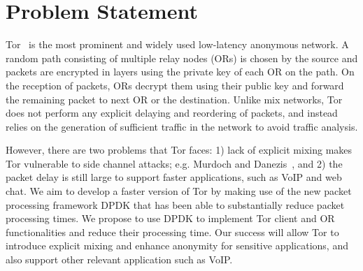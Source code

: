 \section{Problem Statement}
\label{sec:prob-statement}

Tor~\cite{Dingledine:2004:TSO:1251375.1251396} is the most prominent and widely used low-latency anonymous network. A random path consisting of multiple relay nodes (ORs) is chosen by the source and packets are encrypted in layers using the private key of each OR on the path. On the reception of packets,  ORs decrypt them using their public key and forward the remaining packet to next OR or the destination. Unlike mix networks, Tor does not perform any explicit delaying and reordering of packets, and instead relies on the  generation of sufficient traffic in the network to avoid traffic analysis. 

However, there are two problems that Tor faces: 1) lack of explicit mixing makes Tor vulnerable to side channel attacks; e.g. Murdoch and Danezis~\cite{Murdoch:2005:LTA:1058433.1059390}, and 2) the packet delay is still large to support faster applications, such as VoIP and web chat. We aim to develop a faster version of Tor by making use of the new packet processing framework DPDK that has been able to substantially reduce packet processing times. We propose to use DPDK to implement Tor client and OR functionalities and reduce their processing time. Our success will allow Tor to introduce explicit mixing and enhance anonymity for sensitive applications, and also support other relevant application such as VoIP.
